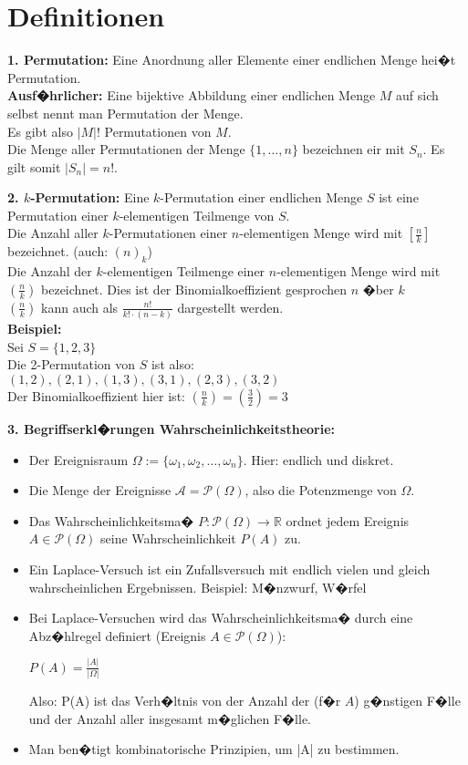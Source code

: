 \section*{Definitionen}
\textbf{1. Permutation:} Eine Anordnung aller Elemente einer endlichen Menge hei�t Permutation.\\
\textbf{Ausf�hrlicher:} Eine bijektive Abbildung einer endlichen Menge $M$ auf sich selbst nennt man Permutation der Menge.\\
Es gibt also $|M|!$ Permutationen von $M$.\\
Die Menge aller Permutationen der Menge $\{1,\dots,n\}$ bezeichnen eir mit $S_n$. Es gilt somit $|S_n| = n!$.

\textbf{2. $k$-Permutation:} Eine $k$-Permutation einer endlichen Menge $S$ ist eine Permutation einer $k$-elementigen Teilmenge von $S$.\\
Die Anzahl aller $k$-Permutationen einer $n$-elementigen Menge wird mit $[\frac{n}{k}]$ bezeichnet. (auch: $(n)_k$)\\
Die Anzahl der $k$-elementigen Teilmenge einer $n$-elementigen Menge wird mit $(\frac{n}{k})$ bezeichnet. Dies ist der Binomialkoeffizient gesprochen \glqq $n$ �ber $k$\grqq\\
$(\frac{n}{k})$ kann auch als $\frac{n!}{k! \cdot (n - k)}$ dargestellt werden.\\
\textbf{Beispiel:}\\
Sei $S = \{1,2,3\}$ \\
Die 2-Permutation von $S$ ist also:\\
$(1,2), (2,1), (1,3), (3,1), (2,3), (3,2)$\\
Der Binomialkoeffizient hier ist: $(\frac{n}{k}) = (\frac{3}{2}) = 3$

\textbf{3. Begriffserkl�rungen Wahrscheinlichkeitstheorie:}
\begin{itemize}
  \item Der Ereignisraum $\Omega := \{\omega_1,\omega_2,\dots,\omega_n\}$. Hier: endlich und diskret.
  \item Die Menge der Ereignisse $\mathcal{A} = \mathcal{P}(\Omega)$, also die Potenzmenge von $\Omega$.
  \item Das Wahrscheinlichkeitsma� $P : \mathcal{P}(\Omega) \rightarrow \mathbb{R}$ ordnet jedem Ereignis $A \in \mathcal{P}(\Omega)$ seine Wahrscheinlichkeit $P(A)$ zu.
  \item Ein Laplace-Versuch ist ein Zufallsversuch mit endlich vielen und gleich wahrscheinlichen Ergebnissen. Beispiel: M�nzwurf, W�rfel
  \item Bei Laplace-Versuchen wird das Wahrscheinlichkeitsma� durch eine Abz�hlregel definiert (Ereignis $A \in \mathcal{P}(\Omega)$):
  \begin{center}
    $P(A) = \frac{|A|}{|\Omega|}$
  \end{center}
  Also: P(A) ist das Verh�ltnis von der Anzahl der (f�r $A$) g�nstigen F�lle und der Anzahl aller insgesamt m�glichen F�lle.
  \item Man ben�tigt kombinatorische Prinzipien, um |A| zu bestimmen.
\end{itemize}

